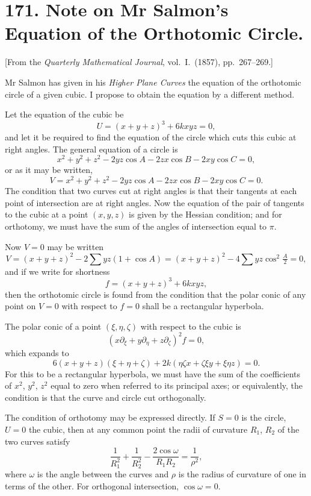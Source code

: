 \documentclass[11pt,a4paper]{article}
\theoremstyle{plain}
\begin{document}
\newpage
\section*{171. Note on Mr Salmon's Equation of the Orthotomic Circle.}

[From the \textit{Quarterly Mathematical Journal}, vol.~I.~(1857), pp.~267--269.]

Mr Salmon has given in his \textit{Higher Plane Curves} the equation of the orthotomic circle of a given cubic. I propose to obtain the equation by a different method.

Let the equation of the cubic be
\[
U = (x+y+z)^3 + 6kxyz = 0,
\]
and let it be required to find the equation of the circle which cuts this cubic at right angles. The general equation of a circle is
\[
x^2+y^2+z^2-2yz\cos A-2zx\cos B-2xy\cos C = 0,
\]
or as it may be written,
\[
V = x^2+y^2+z^2-2yz\cos A-2zx\cos B-2xy\cos C = 0.
\]
The condition that two curves cut at right angles is that their tangents at each point of intersection are at right angles. Now the equation of the pair of tangents to the cubic at a point $(x,y,z)$ is given by the Hessian condition; and for orthotomy, we must have the sum of the angles of intersection equal to $\pi$.

Now $V=0$ may be written
\[
V = (x+y+z)^2 - 2\sum yz(1+\cos A) = (x+y+z)^2 - 4\sum yz\cos^2\tfrac{A}{2} = 0,
\]
and if we write for shortness
\[
f = (x+y+z)^3 + 6kxyz,
\]
then the orthotomic circle is found from the condition that the polar conic of any point on $V=0$ with respect to $f=0$ shall be a rectangular hyperbola.

The polar conic of a point $(\xi,\eta,\zeta)$ with respect to the cubic is
\[
(x\partial_\xi + y\partial_\eta + z\partial_\zeta)^2 f = 0,
\]
which expands to
\[
6(x+y+z)(\xi+\eta+\zeta) + 2k(\eta\zeta x + \zeta\xi y + \xi\eta z) = 0.
\]
For this to be a rectangular hyperbola, we must have the sum of the coefficients of $x^2$, $y^2$, $z^2$ equal to zero when referred to its principal axes; or equivalently, the condition is that the curve and circle cut orthogonally.

The condition of orthotomy may be expressed directly. If $S=0$ is the circle, $U=0$ the cubic, then at any common point the radii of curvature $R_1$, $R_2$ of the two curves satisfy
\[
\frac{1}{R_1^2} + \frac{1}{R_2^2} - \frac{2\cos\omega}{R_1 R_2} = \frac{1}{\rho^2},
\]
where $\omega$ is the angle between the curves and $\rho$ is the radius of curvature of one in terms of the other. For orthogonal intersection, $\cos\omega=0$.
\end{document}
